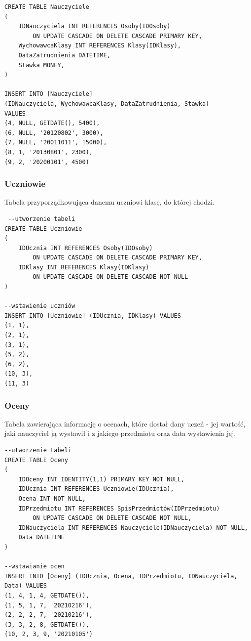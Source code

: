\documentclass[60pt]{article}
\begin{document}
 \begin{verbatim}
CREATE TABLE Nauczyciele
(
    IDNauczyciela INT REFERENCES Osoby(IDOsoby)
        ON UPDATE CASCADE ON DELETE CASCADE PRIMARY KEY,
    WychowawcaKlasy INT REFERENCES Klasy(IDKlasy),
    DataZatrudnienia DATETIME,
    Stawka MONEY,
)

INSERT INTO [Nauczyciele]
(IDNauczyciela, WychowawcaKlasy, DataZatrudnienia, Stawka)
VALUES
(4, NULL, GETDATE(), 5400),
(6, NULL, '20120802', 3000),
(7, NULL, '20011011', 15000),
(8, 1, '20130801', 2300),
(9, 2, '20200101', 4500)
\end{verbatim}
 
\newpage
 
\subsubsection{Uczniowie}
Tabela przyporządkowująca danemu uczniowi klasę, do której chodzi.
 
\begin{verbatim}
 --utworzenie tabeli
CREATE TABLE Uczniowie
(
    IDUcznia INT REFERENCES Osoby(IDOsoby) 
        ON UPDATE CASCADE ON DELETE CASCADE PRIMARY KEY,
    IDKlasy INT REFERENCES Klasy(IDKlasy) 
        ON UPDATE CASCADE ON DELETE CASCADE NOT NULL
)

--wstawienie uczniów
INSERT INTO [Uczniowie] (IDUcznia, IDKlasy) VALUES
(1, 1),
(2, 1),
(3, 1),
(5, 2),
(6, 2),
(10, 3),
(11, 3)
\end{verbatim}
 
 \subsubsection{Oceny}
Tabela zawierająca informację o ocenach, które dostał dany uczeń - jej wartość, jaki nauczyciel ją wystawił i z jakiego przedmiotu oraz data wystawienia jej.
 
\begin{verbatim}
--utworzenie tabeli
CREATE TABLE Oceny
(
    IDOceny INT IDENTITY(1,1) PRIMARY KEY NOT NULL,
    IDUcznia INT REFERENCES Uczniowie(IDUcznia),
    Ocena INT NOT NULL,
    IDPrzedmiotu INT REFERENCES SpisPrzedmiotów(IDPrzedmiotu)
        ON UPDATE CASCADE ON DELETE CASCADE NOT NULL,
    IDNauczyciela INT REFERENCES Nauczyciele(IDNauczyciela) NOT NULL,
    Data DATETIME
)

--wstawianie ocen
INSERT INTO [Oceny] (IDUcznia, Ocena, IDPrzedmiotu, IDNauczyciela, Data) VALUES
(1, 4, 1, 4, GETDATE()),
(1, 5, 1, 7, '20210216'),
(2, 2, 2, 7, '20210216'),
(3, 3, 2, 8, GETDATE()),
(10, 2, 3, 9, '20210105')
\end{verbatim}
\end{document}
